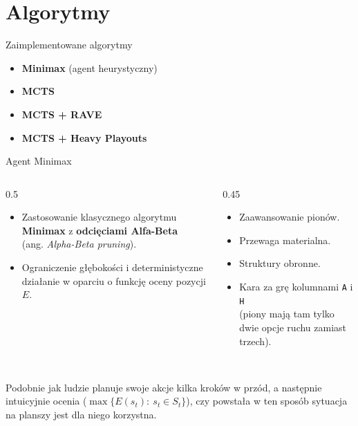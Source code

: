 \documentclass[10pt, aspectratio=169]{beamer}
\begin{document}
\section{Algorytmy}

\begin{frame}{Zaimplementowane algorytmy}
    \begin{itemize}
        \item \textbf{Minimax} (agent heurystyczny)
        \item \textbf{MCTS}~\cite{coulom2006efficient, kocsis2006bandit}
        \item \textbf{MCTS + RAVE}~\cite{gelly2007monte, sutton2018reinforcement}
        \item \textbf{MCTS + Heavy Playouts}~\cite{browne2012survey}
    \end{itemize}
\end{frame}

\begin{frame}{Agent Minimax}

    \begin{columns}[T]
    \begin{column}{0.5\textwidth}
        \vspace{0.1cm}
        \begin{itemize}
            \item Zastosowanie klasycznego algorytmu \textbf{Minimax} z \textbf{odcięciami Alfa-Beta} \\ (ang. \textit{Alpha-Beta pruning}).
            \item Ograniczenie głębokości i deterministyczne działanie w oparciu o funkcję oceny pozycji $E$.
        \end{itemize}
    \end{column}
    
    \begin{column}{0.45\textwidth}
        \vspace{0.1cm}
        \begin{itemize}
            \item Zaawansowanie pionów.
            \item Przewaga materialna.
            \item Struktury obronne.
            \item Kara za grę kolumnami \texttt{A} i \texttt{H} \\(piony mają tam tylko dwie opcje ruchu zamiast trzech).
        \end{itemize}
    \end{column}
    
    \end{columns}

    \vspace{0.6cm}
    
     \\
    Podobnie jak ludzie planuje swoje akcje kilka kroków w przód, a następnie intuicyjnie ocenia ($\max \{E(s_t):~s_t \in S_t\}$), czy powstała w ten sposób sytuacja na planszy jest dla niego korzystna.

\end{frame}
\end{document}
